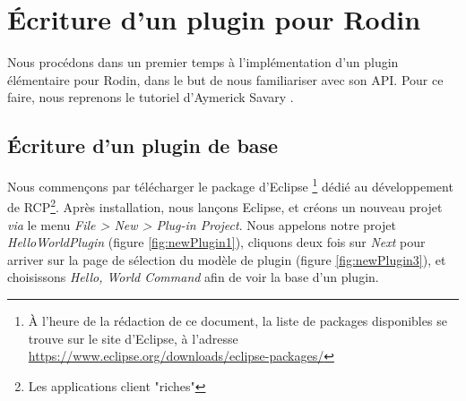 \section{Écriture d'un plugin pour Rodin}

Nous procédons dans un premier temps à l'implémentation d'un plugin élémentaire pour Rodin, dans le but de nous familiariser avec son API.
Pour ce faire, nous reprenons le tutoriel d'Aymerick Savary \cite{asavary}.

\subsection{Écriture d'un plugin de base}

Nous commençons par télécharger le package d'Eclipse
\footnote{À l'heure de la rédaction de ce document, la liste de packages disponibles se trouve sur le site d'Eclipse, %
à l'adresse \href{https://www.eclipse.org/downloads/eclipse-packages/}{https://www.eclipse.org/downloads/eclipse-packages/}
} dédié au développement de RCP\footnote{Les applications client "riches"}.
Après installation, nous lançons Eclipse, et créons un nouveau projet \textit{via} le menu \textit{File > New > Plug-in Project}.
Nous appelons notre projet \textit{HelloWorldPlugin} (figure \ref{fig:newPlugin1}), cliquons deux fois sur \textit{Next} pour arriver %
sur la page de sélection du modèle de plugin (figure \ref{fig:newPlugin3}), et choisissons \textit{Hello, World Command} afin de voir la base d'un plugin.



